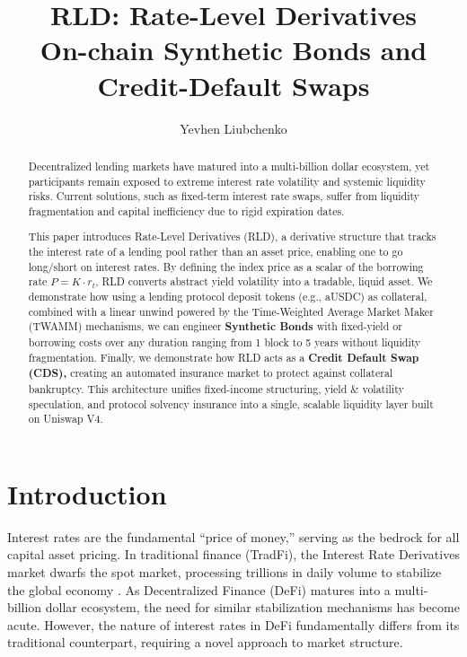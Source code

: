 \documentclass[12pt]{article}
\title{\textbf{RLD: Rate-Level Derivatives} \\ On-chain Synthetic Bonds and Credit-Default Swaps}
\author{Yevhen Liubchenko}
\date{}
\begin{document}
\maketitle

\begin{abstract}
Decentralized lending markets have matured into a multi-billion dollar ecosystem, yet participants remain exposed to extreme interest rate volatility and systemic liquidity risks. Current solutions, such as fixed-term interest rate swaps, suffer from liquidity fragmentation and capital inefficiency due to rigid expiration dates.

This paper introduces Rate-Level Derivatives (RLD), a derivative structure that tracks the interest rate of a lending pool rather than an asset price, enabling one to go long/short on interest rates. By defining the index price as a scalar of the borrowing rate $P = K \cdot r_t$, RLD converts abstract yield volatility into a tradable, liquid asset. We demonstrate how using a lending protocol deposit tokens (e.g., aUSDC) as collateral, combined with a linear unwind powered by the Time-Weighted Average Market Maker (TWAMM) mechanisms, we can engineer \textbf{Synthetic Bonds} with fixed-yield or borrowing costs over any duration ranging from 1 block to 5 years without liquidity fragmentation. Finally, we demonstrate how RLD acts as a \textbf{Credit Default Swap (CDS),} creating an automated insurance market to protect against collateral bankruptcy. This architecture unifies fixed-income structuring, yield \& volatility speculation, and protocol solvency insurance into a single, scalable liquidity layer built on Uniswap V4.
\end{abstract}

\newpage
\tableofcontents
\newpage

\section{Introduction}

Interest rates are the fundamental ``price of money,'' serving as the bedrock for all capital asset pricing. In traditional finance (TradFi), the Interest Rate Derivatives market dwarfs the spot market, processing trillions in daily volume to stabilize the global economy \cite{bis2024ird}. As Decentralized Finance (DeFi) matures into a multi-billion dollar ecosystem, the need for similar stabilization mechanisms has become acute. However, the nature of interest rates in DeFi fundamentally differs from its traditional counterpart, requiring a novel approach to market structure.
\end{document}
